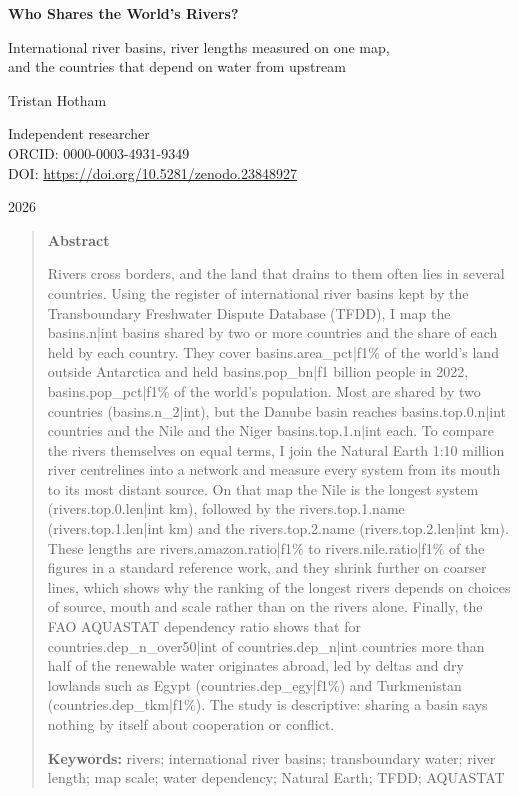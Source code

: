 \documentclass[11pt,a4paper]{article}
\begin{document}
\begin{center}
{\Large\bfseries Who Shares the World's Rivers?\par}
\vspace{0.4em}
{\large International river basins, river lengths measured on one map,\\and the countries that depend on water from upstream\par}
\vspace{1.2em}
{\large Tristan Hotham\par}
\vspace{0.3em}
{\small Independent researcher\\
ORCID: 0000-0003-4931-9349\\
DOI: \href{https://doi.org/10.5281/zenodo.23848927}{https://doi.org/10.5281/zenodo.23848927}\par}
\vspace{0.8em}
2026
\end{center}

\begin{quote}
\small
\begin{center}\textbf{Abstract}\end{center}
Rivers cross borders, and the land that drains to them often lies in several countries. Using the register of international river basins kept by the Transboundary Freshwater Dispute Database (TFDD), I map the {{basins.n|int}} basins shared by two or more countries and the share of each held by each country. They cover {{basins.area_pct|f1}}\% of the world's land outside Antarctica and held {{basins.pop_bn|f1}} billion people in 2022, {{basins.pop_pct|f1}}\% of the world's population. Most are shared by two countries ({{basins.n_2|int}}), but the Danube basin reaches {{basins.top.0.n|int}} countries and the Nile and the Niger {{basins.top.1.n|int}} each. To compare the rivers themselves on equal terms, I join the Natural Earth 1:10 million river centrelines into a network and measure every system from its mouth to its most distant source. On that map the Nile is the longest system ({{rivers.top.0.len|int}} km), followed by the {{rivers.top.1.name}} ({{rivers.top.1.len|int}} km) and the {{rivers.top.2.name}} ({{rivers.top.2.len|int}} km). These lengths are {{rivers.amazon.ratio|f1}}\% to {{rivers.nile.ratio|f1}}\% of the figures in a standard reference work, and they shrink further on coarser lines, which shows why the ranking of the longest rivers depends on choices of source, mouth and scale rather than on the rivers alone. Finally, the FAO AQUASTAT dependency ratio shows that for {{countries.dep_n_over50|int}} of {{countries.dep_n|int}} countries more than half of the renewable water originates abroad, led by deltas and dry lowlands such as Egypt ({{countries.dep_egy|f1}}\%) and Turkmenistan ({{countries.dep_tkm|f1}}\%). The study is descriptive: sharing a basin says nothing by itself about cooperation or conflict.

\textbf{Keywords:} rivers; international river basins; transboundary water; river length; map scale; water dependency; Natural Earth; TFDD; AQUASTAT
\end{quote}
\end{document}
